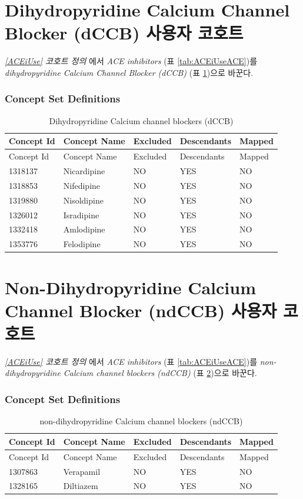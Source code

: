 \documentclass[10.5pt]{book}
\theoremstyle{definition}
\theoremstyle{definition}
\theoremstyle{definition}
\theoremstyle{remark}
\begin{document}
\section{Dihydropyridine Calcium Channel Blocker (dCCB) 사용자
코호트}\label{dCCBUse}

\emph{\ref{ACEiUse} 코호트 정의} 에서 \emph{ACE inhibitors} (표
\ref{tab:ACEiUseACE})를 \emph{dihydropyridine Calcium Channel Blocker
(dCCB)} (표 \ref{tab:dCCBUsedCBB})으로 바꾼다.

\subsubsection*{Concept Set
Definitions}\label{concept-set-definitions-9}

\begin{longtable}[]{@{}lllll@{}}
\caption{\label{tab:dCCBUsedCBB} Dihydropyridine Calcium channel blockers
(dCCB)}\tabularnewline
\toprule
Concept Id & Concept Name & Excluded & Descendants &
Mapped\tabularnewline
\midrule
\endfirsthead
\toprule
Concept Id & Concept Name & Excluded & Descendants &
Mapped\tabularnewline
\midrule
\endhead
1318137 & Nicardipine & NO & YES & NO\tabularnewline
1318853 & Nifedipine & NO & YES & NO\tabularnewline
1319880 & Nisoldipine & NO & YES & NO\tabularnewline
1326012 & Isradipine & NO & YES & NO\tabularnewline
1332418 & Amlodipine & NO & YES & NO\tabularnewline
1353776 & Felodipine & NO & YES & NO\tabularnewline
\bottomrule
\end{longtable}

\section{Non-Dihydropyridine Calcium Channel Blocker (ndCCB) 사용자
코호트}\label{ndCCBUse}

\emph{\ref{ACEiUse} 코호트 정의} 에서 \emph{ACE inhibitors} (표
\ref{tab:ACEiUseACE})를 \emph{non-dihydropyridine Calcium channel
blockers (ndCCB)} (표 \ref{tab:ndCCBUsendCCB})으로 바꾼다.

\subsubsection*{Concept Set
Definitions}\label{concept-set-definitions-10}

\begin{longtable}[]{@{}lllll@{}}
\caption{\label{tab:ndCCBUsendCCB} non-dihydropyridine Calcium channel
blockers (ndCCB)}\tabularnewline
\toprule
Concept Id & Concept Name & Excluded & Descendants &
Mapped\tabularnewline
\midrule
\endfirsthead
\toprule
Concept Id & Concept Name & Excluded & Descendants &
Mapped\tabularnewline
\midrule
\endhead
1307863 & Verapamil & NO & YES & NO\tabularnewline
1328165 & Diltiazem & NO & YES & NO\tabularnewline
\bottomrule
\end{longtable}
\end{document}
